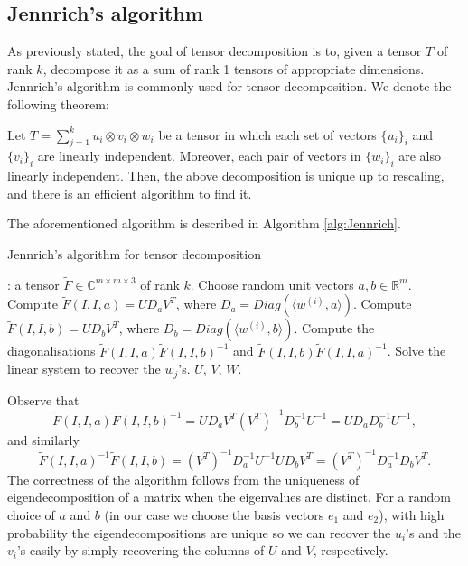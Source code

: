 \subsection{Jennrich's algorithm}
As previously stated, the goal of tensor decomposition is to, given a tensor $T$ of rank $k$, decompose it as a sum of rank 1 tensors of appropriate dimensions. Jennrich's algorithm is commonly used for tensor decomposition. We denote the following theorem:
\begin{theorem}
    Let $T=\sum_{j=1}^k u_i\otimes v_i\otimes w_i$ be a tensor in which each set of vectors $\{u_i\}_i$ and $\{v_i\}_i$ are linearly independent. Moreover, each pair of vectors in $\{w_i\}_i$ are also linearly independent. Then, the above decomposition is unique up to rescaling, and there is an efficient algorithm to find it.
\end{theorem}
The aforementioned algorithm is described in Algorithm \ref{alg:Jennrich}.
\begin{algorithm}
    \caption{Jennrich's algorithm for tensor decomposition}
    \label{alg:Jennrich}
    \begin{algorithmic}
        : a tensor $\tilde{F}\in\mathbb{C}^{m\times m\times 3}$ of rank $k$.
        \State Choose random unit vectors $a,b\in\mathbb{R}^m$.
        \State Compute $\tilde{F}(I,I,a)=UD_aV^T$, where $D_a=Diag(\langle w^{(i)},a\rangle)$.
        \State Compute $\tilde{F}(I,I,b)=UD_bV^T$, where $D_b=Diag(\langle w^{(i)},b\rangle)$.
        \State Compute the diagonalisations $\tilde{F}(I,I,a)\tilde{F}(I,I,b)^{-1}$ and $\tilde{F}(I,I,b)\tilde{F}(I,I,a)^{-1}$.
        \State Solve the linear system to recover the $w_j$'s.
         $U$, $V$, $W$.
    \end{algorithmic}
\end{algorithm}
Observe that $$\tilde{F}(I,I,a)\tilde{F}(I,I,b)^{-1}=UD_aV^T(V^T)^{-1}D_b^{-1}U^{-1}=UD_aD_b^{-1}U^{-1},$$ and similarly $$\tilde{F}(I,I,a)^{-1}\tilde{F}(I,I,b)=(V^T)^{-1}D_a^{-1}U^{-1}UD_bV^T=(V^T)^{-1}D_a^{-1}D_bV^T.$$ The correctness of the algorithm follows from the uniqueness of eigendecomposition of a matrix when the eigenvalues are distinct. For a random choice of $a$ and $b$ (in our case we choose the basis vectors $e_1$ and $e_2$), with high probability the eigendecompositions are unique so we can recover the $u_i$'s and the $v_i$'s easily by simply recovering the columns of $U$ and $V$, respectively.